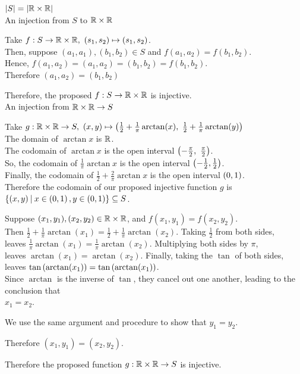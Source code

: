 \documentclass[a4paper, 11pt]{report}
\begin{document}
\Claim $\left| S \right| = \left| \mathbb{R}\times\mathbb{R} \right|$
\proof ${}^{}$\\
An injection from $S$ to $\mathbb{R}\times\mathbb{R}$
\begin{list}{}{\setlength{\topsep}{0pt}\setlength{\leftmargin}{0.5in}}\item
  Take $f:S\to\bbr\times\bbr,\ (s_1,s_2)\mapsto (s_1,s_2)$. \\
  Then, suppose $(a_1,a_1),(b_1,b_2)\in S$ and $f(a_1,a_2)=f(b_1,b_2)$. \\
  Hence, $f(a_1,a_2) = (a_1,a_2) = (b_1,b_2) = f(b_1,b_2)$. \\
  Therefore $(a_1,a_2) = (b_1,b_2)$ 
\end{list}
Therefore, the proposed $f:S\to\mathbb{R}\times\mathbb{R}$ is injective. \\

An injection from $\mathbb{R}\times\mathbb{R}\to S$
\begin{list}{}{\setlength{\topsep}{0pt}\setlength{\leftmargin}{0.5in}}\item
  Take $g:\bbr\times\bbr\to S,\ (x,y)\mapsto\bracks{\frac{1}{2}+\frac{1}{\pi}\arctan(x),\ \frac{1}{2}+\frac{1}{\pi}\arctan(y)}$ \\
  The domain of $\arctan x$ is $\mathbb{R}$. \\
  The codomain of $\arctan x$ is the open interval $\bracks{-\frac{\pi}{2},\ \frac{\pi}{2}}$. \\
  So, the codomain of $\frac{1}{\pi}\arctan x$ is the open interval $\left( -\frac{1}{2}, \frac{1}{2} \right)$. \\
  Finally, the codomain of $\frac{1}{2}+\frac{2}{\pi}\arctan x$ is the open interval $\left( 0,1 \right)$. \\
  Therefore the codomain of our proposed injective function $g$ is \\
  $\left\lbrace (x,y)\medspace\middle|\medspace x\in\left( 0,1 \right),y\in\left( 0,1 \right) \right\rbrace\subseteq S$. 

  Suppose $(x_1,y_1),(x_2,y_2)\in\mathbb{R}\times\mathbb{R}$, and $f(x_1,y_1)=f(x_2,y_2)$. \\
  Then $\frac{1}{2}+\frac{1}{\pi}\arctan(x_1)=\frac{1}{2}+\frac{1}{\pi}\arctan(x_2)$. Taking $\frac{1}{2}$ from both sides, \\
  leaves $\frac{1}{\pi}\arctan(x_1)=\frac{1}{\pi}\arctan(x_2)$. Multiplying both sides by $\pi$, \\
  leaves $\arctan(x_1)=\arctan(x_2)$. Finally, taking the $\tan$ of both sides, \\
  leaves $\tan\left( \arctan(x_1) \right) = \tan\left( \arctan(x_1) \right)$. \\
  Since $\arctan$ is the inverse of $\tan$, they cancel out one another, leading to the conclusion that \\
  $x_1=x_2$.

  We use the same argument and procedure to show that $y_1 = y_2$. 

  Therefore $(x_1,y_1)=(x_2,y_2)$.
\end{list}
Therefore the proposed function $g:\mathbb{R}\times\mathbb{R}\to S$ is injective. \\
\end{document}
